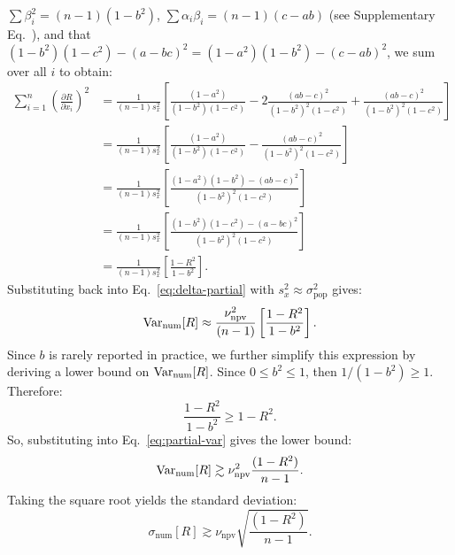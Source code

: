 $\sum\beta_i^2 = (n-1)(1 - b^{2})$, $\sum\alpha_i\beta_i = (n-1)(c - ab)$ (see
Supplementary Eq.~), and that
$(1-b^{2})(1-c^{2})-{(a-bc)}^{2} = (1-a^{2})(1-b^{2})-{(c-ab)}^{2}$, we sum over
all $i$ to obtain:
\begin{align*}
    \sum_{i=1}^{n}
    {\left(\frac{\partial R}{\partial x_i}\right)}^{2}
     & =
    \frac{1}{(n-1)s_{x}^{2}}
    \left[
        \frac{(1 - a^{2})}{(1 - b^{2})(1 - c^{2})}
        -
        2\frac{{(ab - c)}^{2}}{{(1 - b^{2})}^{2}(1 - c^{2})}
        +
        \frac{{(ab - c)}^{2}}{{(1 - b^{2})}^{2}(1 - c^{2})}
    \right] \\
     & =
    \frac{1}{(n-1)s_{x}^{2}}
    \left[
        \frac{(1 - a^{2})}{(1 - b^{2})(1 - c^{2})}
        -
        \frac{{(ab - c)}^{2}}{{(1 - b^{2})}^{2}(1 - c^{2})}
    \right] \\
     & =
    \frac{1}{(n-1)s_{x}^{2}}
    \left[
    \frac{(1 - a^{2})(1-b^{2}) - {(ab - c)}^{2}}{{(1 - b^{2})}^{2}(1 - c^{2})}
    \right] \\
     & =
    \frac{1}{(n-1)s_{x}^{2}}
    \left[
    \frac{(1 - b^{2})(1-c^{2}) - {(a - bc)}^{2}}{{(1 - b^{2})}^{2}(1 - c^{2})}
    \right] \\
     & =
    \frac{1}{(n-1)s_{x}^{2}}
    \left[
        \frac{1  - R^{2}}{1 - b^{2}}
        \right].
\end{align*}
Substituting back into Eq.~\eqref{eq:delta-partial} with $s_x^2 \approx
    \sigma_{\mathrm{pop}}^2$ gives:
\begin{equation}
    \mathrm{Var}_{\mathrm{num}}[R]
    \approx
    \frac{\nu_{\mathrm{npv}}^{2}}{(n-1)}
    \left[
    \frac{1-R^{2}}{1 - b^{2}}
    \right].
    \label{eq:partial-var}
\end{equation}
Since $b$ is rarely reported in practice, we further simplify this expression by
deriving a lower bound on $\mathrm{Var}_{\mathrm{num}}[R]$. Since $0 \leq b^{2} \leq 1$,
then $1/(1 - b^{2}) \geq 1$. Therefore:
\begin{equation}
    \frac{1-R^{2}}{1 - b^{2}} \geq 1 - R^{2}.
    \label{eq:partial-corr-bound}
\end{equation}
So, substituting into Eq.~\eqref{eq:partial-var} gives the lower bound:
\begin{equation}
    \mathrm{Var}_{\mathrm{num}}[R]
    \gtrsim
    \nu_{\mathrm{npv}}^{2}\frac{(1 - R^{2})}{n-1}.
    \label{eq:partial-var-bound}
\end{equation}
Taking the square root yields the standard deviation:
\[
    \sigma_{\mathrm{num}}[R]
    \gtrsim
    \nu_{\mathrm{npv}}
    \sqrt{\frac{(1 - R^{2})}{n - 1}}.
\]
